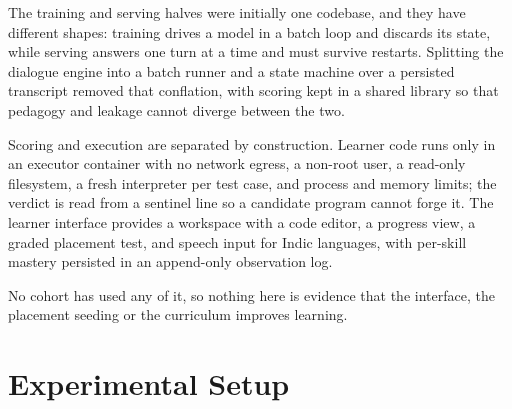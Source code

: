 \documentclass[conference]{IEEEtran}
\begin{document}
The training and serving halves were initially one codebase, and they have
different shapes: training drives a model in a batch loop and discards its
state, while serving answers one turn at a time and must survive restarts.
Splitting the dialogue engine into a batch runner and a state machine over a
persisted transcript removed that conflation, with scoring kept in a shared
library so that pedagogy and leakage cannot diverge between the two.

Scoring and execution are separated by construction. Learner code runs only in
an executor container with no network egress, a non-root user, a read-only
filesystem, a fresh interpreter per test case, and process and memory limits;
the verdict is read from a sentinel line so a candidate program cannot forge
it. The learner interface provides a workspace with a code editor, a progress
view, a graded placement test, and speech input for Indic languages, with
per-skill mastery persisted in an append-only observation log.

No cohort has used any of it, so nothing here is evidence that the interface,
the placement seeding or the curriculum improves learning.

\section{Experimental Setup}
\label{sec:setup}
\end{document}
